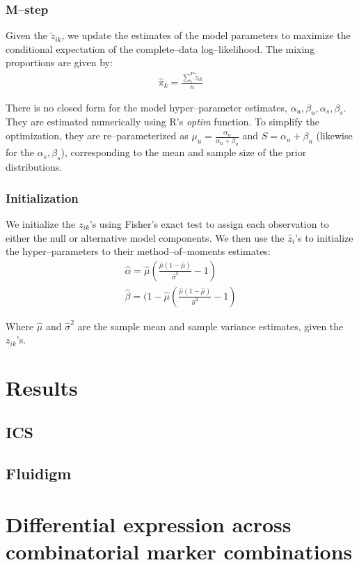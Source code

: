 \documentclass[11pt]{article}
\begin{document}
\subsubsection{M--step}
Given the $\tilde{z}_{ik}$, we update the estimates of the model parameters to maximize the conditional expectation of the complete--data log--likelihood. The mixing proportions are given by:
\begin{align}
\hat\pi_k = \frac{ \sum_i^P \tilde z_{ik}}{n}
\end{align}

There is no closed form for the model hyper--parameter estimates, $\alpha_u,\beta_u,\alpha_s,\beta_s$. They are estimated numerically using R's \textit{optim} function. To simplify the optimization, they are re--parameterized as $\mu_u=\frac{\alpha_u}{\alpha_u+\beta_u}$ and $S=\alpha_u+\beta_u$ (likewise for the $\alpha_s,\beta_s$), corresponding to the mean and sample size of the prior distributions. 

\subsubsection{Initialization}
We initialize the $z_{ik}$'s using Fisher's exact test to assign each observation to either the null or alternative model components. We then use the $\hat{z}_i$'s to initialize the hyper--parameters to their method--of--moments estimates:
\begin{align}
\hat{\alpha} = \hat{\mu}\left(\frac{\hat{\mu}(1-\hat{\mu})}{\hat{\sigma}^2} -1\right)\\
\hat{\beta} =  (1-\hat{\mu}\left(\frac{\hat{\mu}(1-\hat{\mu})}{\hat{\sigma}^2} -1\right)
\end{align}

Where $\hat{\mu}$ and $\hat{\sigma}^2$ are the sample mean and sample variance estimates, given the $z_{ik}$'s.


\section{Results}
\subsection{ICS}
\subsection{Fluidigm}
\section{Differential expression across combinatorial marker combinations}
\end{document}
